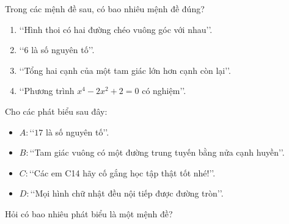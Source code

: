 \begin{bt}%
	Trong các mệnh đề  sau, có bao nhiêu mệnh đề đúng?
	\begin{enumerate}
		\item \lq\lq Hình thoi có hai đường chéo vuông  góc với nhau\rq\rq.
		 \item \lq\lq $6$ là số nguyên tố\rq\rq.
		\item \lq\lq Tổng hai cạnh của một tam giác lớn hơn  cạnh còn lại\rq\rq.
		\item \lq\lq Phương  trình $x^4-2x^2+2=0$ có nghiệm\rq\rq.
	\end{enumerate}
\end{bt}

\begin{bt}%
	Cho các phát  biểu sau đây:
	\begin{itemize}
		\item $A\colon$\lq\lq $17$ là số  nguyên tố\rq\rq.
		\item $B\colon$\lq\lq Tam giác  vuông có một đường trung tuyến bằng nửa cạnh huyền\rq\rq.
		\item $C\colon$\lq\lq Các em C14 hãy cố gắng học tập thật  tốt nhé!\rq\rq.
		\item $D\colon$\lq\lq Mọi hình chữ nhật đều nội tiếp được đường  tròn\rq\rq.
	\end{itemize}
	Hỏi có bao nhiêu phát biểu là một  mệnh đề?
\end{bt}

